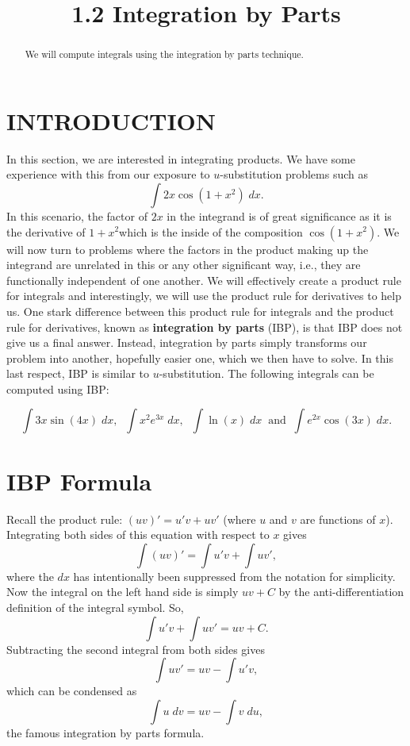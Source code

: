 \documentclass[handout]{ximera}
\title{1.2 Integration by Parts}
\begin{document}
\begin{abstract}
We will compute integrals using the integration by parts technique.
\end{abstract}

\maketitle

\section{INTRODUCTION}
In this section, we are interested in integrating products.  
We have some experience with this from our exposure to $u$-substitution problems such as
\[
\int 2x \cos(1 + x^2) \; dx.
\]
In this scenario, the factor of $2x$ in the integrand is of great significance 
as it is the derivative of $1 + x^2$which is the inside of the composition $\cos(1+x^2)$.
We will now turn to problems where the factors in the product making up the integrand
are unrelated in this or any other significant way, i.e., they are functionally independent of one another.
We will effectively create a product rule for integrals and interestingly, we will 
use the product rule for derivatives to help us. One stark difference between this product rule for
integrals and the product rule for derivatives, known as \textbf{integration by parts} (IBP), is that IBP does not give us a final answer. Instead, integration by parts
simply transforms our problem into another, hopefully easier one, which we then have to solve.
In this last respect, IBP is similar to $u$-substitution. The following integrals can be computed using IBP:

\[
\int 3x\sin(4x) \; dx,\;\; \int x^2 e^{3x} \; dx,\;\; \int \ln(x) \; dx \;\;\text{and}\;\; \int e^{2x}\cos(3x) \; dx.
\]



\section{IBP Formula}

Recall the product rule: $(uv)' = u'v+uv'$ (where $u$ and $v$ are functions of $x$).
Integrating both sides of this equation with respect to $x$ gives
\[
\int (uv)' = \int u'v + \int uv',
\]
where the $dx$ has intentionally been suppressed from the notation for simplicity.
Now the integral on the left hand side is simply $uv + C$ by the anti-differentiation
definition of the integral symbol. So,
\[
\int u'v + \int uv' = uv + C.
\]
Subtracting the second integral from both sides gives
\[
\int uv' = uv - \int u'v,
\]
which can be condensed as
\[
\int u \; dv = uv - \int v \; du,
\]
the famous integration by parts formula.
\end{document}
